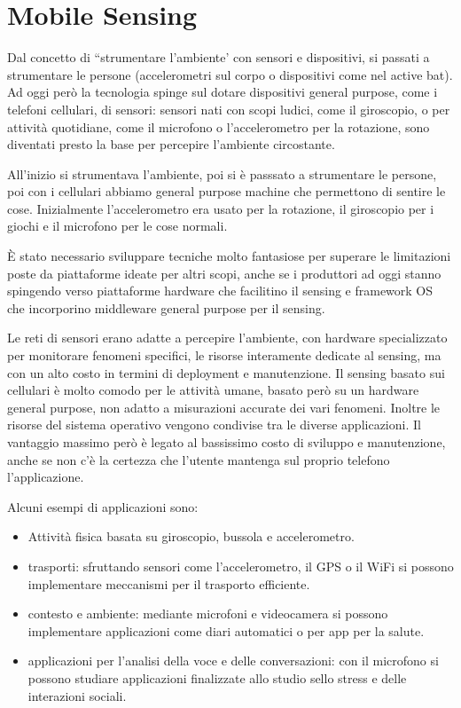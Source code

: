 \chapter{Mobile Sensing}
Dal concetto di ``strumentare l'ambiente' con sensori e dispositivi, si passati a
strumentare le persone (accelerometri sul corpo o dispositivi come nel active
bat). Ad oggi però la tecnologia spinge sul dotare dispositivi general purpose,
come i telefoni cellulari, di sensori: sensori nati con scopi ludici, come il
giroscopio, o per attività quotidiane, come il microfono o l'accelerometro per
la rotazione, sono diventati presto la base per percepire l'ambiente
circostante.

All'inizio si strumentava l'ambiente, poi si è passsato a strumentare le persone,
poi con i cellulari abbiamo general purpose machine che permettono di sentire le
cose. Inizialmente l'accelerometro era usato per la rotazione, il giroscopio per
i giochi e il microfono per le cose normali.

È stato necessario sviluppare tecniche molto fantasiose per superare le
limitazioni poste da piattaforme ideate per altri scopi, anche se i produttori
ad oggi stanno spingendo verso piattaforme hardware che facilitino il sensing e
framework OS che incorporino middleware general purpose per il sensing.

Le reti di sensori erano adatte a percepire l'ambiente, con hardware
specializzato per monitorare fenomeni specifici, le risorse interamente dedicate
al sensing, ma con un alto costo in termini di deployment e manutenzione.
Il sensing basato sui cellulari è molto comodo per le attività umane, basato
però su un hardware general purpose, non adatto a misurazioni accurate dei vari
fenomeni. Inoltre le risorse del sistema operativo vengono condivise tra le
diverse applicazioni. Il vantaggio massimo però è legato al bassissimo costo di
sviluppo e manutenzione, anche se non c'è la certezza che l'utente mantenga sul
proprio telefono l'applicazione.

Alcuni esempi di applicazioni sono:
\begin{itemize}
\item Attività fisica basata su giroscopio, bussola e accelerometro.
\item trasporti: sfruttando sensori come l'accelerometro, il GPS o il WiFi si
possono implementare meccanismi per il trasporto efficiente.
\item contesto e ambiente: mediante microfoni e videocamera si possono
implementare applicazioni come diari automatici o per app per la salute.
\item applicazioni per l'analisi della voce e delle conversazioni: con il
microfono si possono studiare applicazioni finalizzate allo studio sello stress
e delle interazioni sociali.
\end{itemize}

